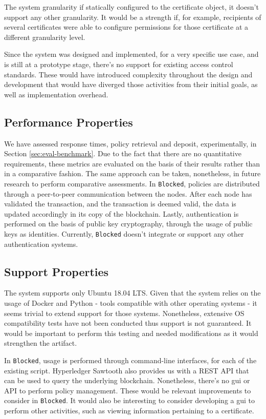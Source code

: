 The system granularity if statically configured to the certificate object, it doesn't support any other granularity. It would be a strength if, for example, recipients of several certificates were able to configure permissions for those certificate at a different granularity level.

Since the system was designed and implemented, for a very specific use case, and is still at a prototype stage, there's no support for existing access control standards. These would have introduced complexity throughout the design and development that would have diverged those activities from their initial goals, as well as implementation overhead.

\subsection{Performance Properties}

We have assessed response times, policy retrieval and deposit, experimentally, in Section \ref{sec:eval-benchmark}. Due to the fact that there are no quantitative requirements, these metrics are evaluated on the basis of their results rather than in a comparative fashion. The same approach can be taken, nonetheless, in future research to perform comparative assessments. In \texttt{Blocked}, policies are distributed through a peer-to-peer communication between the nodes. After each node has validated the transaction, and the transaction is deemed valid, the data is updated accordingly in its copy of the blockchain. Lastly, authentication is performed on the basis of public key cryptography, through the usage of public keys as identities. Currently, \texttt{Blocked} doesn't integrate or support any other authentication systems.

\subsection{Support Properties}

The system supports only Ubuntu 18.04 LTS. Given that the system relies on the usage of Docker and Python - tools compatible with other operating systems - it seems trivial to extend support for those systems. Nonetheless, extensive OS compatibility tests have not been conducted thus support is not guaranteed. It would be important to perform this testing and needed modifications as it would strengthen the artifact.

In \texttt{Blocked}, usage is performed through command-line interfaces, for each of the existing script. Hyperledger Sawtooth also provides us with a REST API that can be used to query the underlying blockchain. Nonetheless, there's no \gls{gui} or API to perform policy management. These would be relevant improvements to consider in \texttt{Blocked}. It would also be interesting to consider developing a \gls{gui} to perform other activities, such as viewing information pertaining to a certificate.

